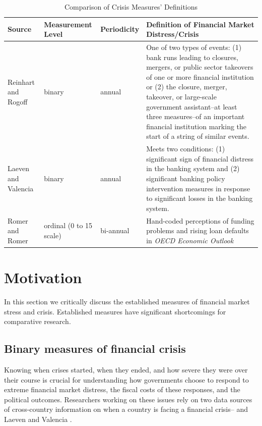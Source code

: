 \documentclass[]{article}
\begin{document}
\begin{table}
    \caption{Comparison of Crisis Measures' Definitions}
    \label{comp_table}
    \begin{center}
        \begin{tabular}{m{3cm} | m{2cm} m{2cm} m{7cm}}
            Source & Measurement Level & Periodicity &  Definition of Financial Market Distress/Crisis \\
            \hline\hline
                Reinhart and Rogoff \citeyearpar[11]{Reinhart2009,ReinhartRog2010} & binary & annual & One of two types of events: (1) bank runs leading to closures, mergers, or public sector takeovers of one or more financial institution or (2) the closure, merger, takeover, or large-scale government assistant--at least three measures--of an important financial institution marking the start of a string of similar events.  \\[1cm]
                Laeven and Valencia \citeyearpar[228]{laeven2013} & binary & annual & Meets two conditions: (1) significant sign of financial distress in the banking system and (2) significant banking policy intervention measures in response to significant losses in the banking system.  \\[1cm]
                Romer and Romer \citeyearpar[3]{Romer2015} & ordinal (0 to 15 scale) & bi-annual & Hand-coded perceptions of funding problems and rising loan defaults in \emph{OECD Economic Outlook}  \\
            \hline
        \end{tabular}
    \end{center}
\end{table}

\section{Motivation}\label{motivation}

In this section we critically discuss the established measures of financial market stress and crisis. Established measures have significant shortcomings for comparative research.

\subsection{Binary measures of financial crisis}

Knowing when crises started, when they ended, and how severe they were over their course is crucial for understanding how governments choose to respond to extreme financial market distress, the fiscal costs of these responses, and the political outcomes. Researchers working on these issues rely on two data sources of cross-country information on when a country is facing a financial crisis--\cite{Reinhart2009,ReinhartRog2010} and Laeven and Valencia \citeyearpar[and their predecessors]{laeven2013}.
\end{document}
